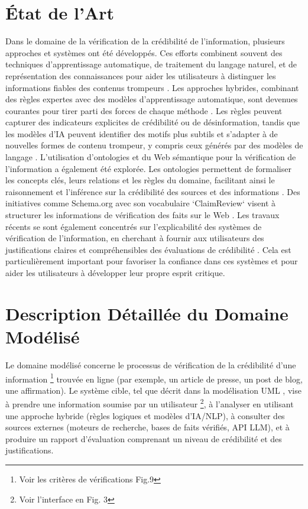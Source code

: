 \documentclass[9pt,twocolumn,twoside,french]{article}
\begin{document}
\section{État de l'Art}
Dans le domaine de la vérification de la crédibilité de l'information, plusieurs approches et systèmes ont été développés. Ces efforts combinent souvent des techniques d'apprentissage automatique, de traitement du langage naturel, et de représentation des connaissances pour aider les utilisateurs à distinguer les informations fiables des contenus trompeurs \parencite{Oshikawa2019A, Sharma2021Combating, de2026A}.
Les approches hybrides, combinant des règles expertes avec des modèles d'apprentissage automatique, sont devenues courantes pour tirer parti des forces de chaque méthode \parencite{Ahmed2025Aidriven}. Les règles peuvent capturer des indicateurs explicites de crédibilité ou de désinformation, tandis que les modèles d'IA peuvent identifier des motifs plus subtils et s'adapter à de nouvelles formes de contenu trompeur, y compris ceux générés par des modèles de langage \parencite{Loth2025Blessing, Chen2024Combating}.
L'utilisation d'ontologies et du Web sémantique pour la vérification de l'information a également été explorée. Les ontologies permettent de formaliser les concepts clés, leurs relations et les règles du domaine, facilitant ainsi le raisonnement et l'inférence sur la crédibilité des sources et des informations \parencite{Pescuma2025}. Des initiatives comme Schema.org avec son vocabulaire `ClaimReview` visent à structurer les informations de vérification des faits sur le Web \parencite{ClaimReviewSchema}.
Les travaux récents se sont également concentrés sur l'explicabilité des systèmes de vérification de l'information, en cherchant à fournir aux utilisateurs des justifications claires et compréhensibles des évaluations de crédibilité \parencite{Li2021Debunking}. Cela est particulièrement important pour favoriser la confiance dans ces systèmes et pour aider les utilisateurs à développer leur propre esprit critique.


\section{Description Détaillée du Domaine Modélisé}
\label{sec:domaine}

Le domaine modélisé concerne le processus de vérification de la crédibilité d'une information \footnote{Voir les critères de vérifications Fig.9} trouvée en ligne (par exemple, un article de presse, un post de blog, une affirmation). Le système cible, tel que décrit dans la modélisation UML \parencite{Loyer2004Projet}, vise à prendre une information soumise par un utilisateur \footnote{Voir l'interface en Fig. 3}, à l'analyser en utilisant une approche hybride (règles logiques et modèles d'IA/NLP), à consulter des sources externes (moteurs de recherche, bases de faits vérifiés, API LLM), et à produire un rapport d'évaluation comprenant un niveau de crédibilité et des justifications.
\end{document}
